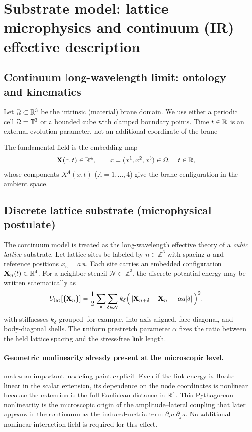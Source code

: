 \section{Substrate model: lattice microphysics and continuum (IR) effective description}
\label{sec:continuum-model}

\subsection{Continuum long-wavelength limit: ontology and kinematics}

Let $\Omega\subset\mathbb{R}^3$ be the intrinsic (material) brane domain.
We use either a periodic cell $\Omega=\mathbb{T}^3$ or a bounded cube with clamped boundary points.
Time $t\in\mathbb{R}$ is an external evolution parameter, not an additional coordinate of the brane.

The fundamental field is the embedding map
\begin{equation}
  \mathbf{X}(x,t)\in\mathbb{R}^4,
  \qquad x=(x^1,x^2,x^3)\in\Omega,\quad t\in\mathbb{R},
  \label{eq:fundamental-field}
\end{equation}
whose components $X^A(x,t)$ ($A=1,\dots,4$) give the brane configuration in the ambient space.

\subsection{Discrete lattice substrate (microphysical postulate)}
\label{subsec:lattice-substrate}

The continuum model is treated as the long-wavelength effective theory of a \emph{cubic lattice} substrate.
Let lattice sites be labeled by $n\in\mathbb{Z}^3$ with spacing $a$ and reference positions $x_n=a\,n$.
Each site carries an embedded configuration $\mathbf{X}_n(t)\in\mathbb{R}^4$.
For a neighbor stencil $\mathcal N\subset\mathbb{Z}^3$, the discrete potential energy may be written schematically as
\begin{equation}
  U_{\mathrm{lat}}[\{\mathbf{X}_n\}]
  =
  \frac12\sum_n\sum_{\delta\in\mathcal N}
  k_{\delta}
  \Big(\,\lvert \mathbf{X}_{n+\delta}-\mathbf{X}_n\rvert-\alpha a\lvert\delta\rvert\,\Big)^2,
  \label{eq:lattice-energy}
\end{equation}
with stiffnesses $k_{\delta}$ grouped, for example, into axis-aligned, face-diagonal, and body-diagonal shells.
The uniform prestretch parameter $\alpha$ fixes the ratio between the held lattice spacing and the stress-free link
length.

\paragraph{Geometric nonlinearity already present at the microscopic level.}
 makes an important modeling point explicit.
Even if the link energy is Hooke-linear in the scalar extension,
its dependence on the node coordinates is nonlinear because the extension is the full Euclidean distance in $\mathbb{R}^4$.
This Pythagorean nonlinearity is the microscopic origin of the amplitude--lateral coupling that later appears in the
continuum as the induced-metric term $\partial_i u\,\partial_j u$.
No additional nonlinear interaction field is required for this effect.

